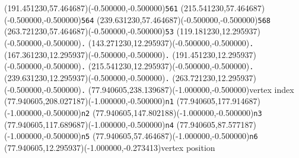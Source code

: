 \documentclass[12pt]{article}
\begin{document}
\fontsize{12.000000}{14.400000}\selectfont
\ASYalign(191.451230,57.464687)(-0.500000,-0.500000){\texttt{561}}%
\color{ASYcolor}
\fontsize{12.000000}{14.400000}\selectfont
\ASYalign(215.541230,57.464687)(-0.500000,-0.500000){\texttt{564}}%
\color{ASYcolor}
\fontsize{12.000000}{14.400000}\selectfont
\ASYalign(239.631230,57.464687)(-0.500000,-0.500000){\texttt{568}}%
\color{ASYcolor}
\fontsize{12.000000}{14.400000}\selectfont
\ASYalign(263.721230,57.464687)(-0.500000,-0.500000){\texttt{53}}%
\color{ASYcolor}
\fontsize{12.000000}{14.400000}\selectfont
\ASYalign(119.181230,12.295937)(-0.500000,-0.500000){\texttt{.}}%
\color{ASYcolor}
\fontsize{12.000000}{14.400000}\selectfont
\ASYalign(143.271230,12.295937)(-0.500000,-0.500000){\texttt{.}}%
\color{ASYcolor}
\fontsize{12.000000}{14.400000}\selectfont
\ASYalign(167.361230,12.295937)(-0.500000,-0.500000){\texttt{.}}%
\color{ASYcolor}
\fontsize{12.000000}{14.400000}\selectfont
\ASYalign(191.451230,12.295937)(-0.500000,-0.500000){\texttt{.}}%
\color{ASYcolor}
\fontsize{12.000000}{14.400000}\selectfont
\ASYalign(215.541230,12.295937)(-0.500000,-0.500000){\texttt{.}}%
\color{ASYcolor}
\fontsize{12.000000}{14.400000}\selectfont
\ASYalign(239.631230,12.295937)(-0.500000,-0.500000){\texttt{.}}%
\color{ASYcolor}
\fontsize{12.000000}{14.400000}\selectfont
\ASYalign(263.721230,12.295937)(-0.500000,-0.500000){\texttt{.}}%
\color{ASYcolor}
\fontsize{12.000000}{14.400000}\selectfont
\ASYalign(77.940605,238.139687)(-1.000000,-0.500000){vertex index}%
\color{ASYcolor}
\fontsize{12.000000}{14.400000}\selectfont
\ASYalign(77.940605,208.027187)(-1.000000,-0.500000){\texttt{n1}}%
\color{ASYcolor}
\fontsize{12.000000}{14.400000}\selectfont
\ASYalign(77.940605,177.914687)(-1.000000,-0.500000){\texttt{n2}}%
\color{ASYcolor}
\fontsize{12.000000}{14.400000}\selectfont
\ASYalign(77.940605,147.802188)(-1.000000,-0.500000){\texttt{n3}}%
\color{ASYcolor}
\fontsize{12.000000}{14.400000}\selectfont
\ASYalign(77.940605,117.689687)(-1.000000,-0.500000){\texttt{n4}}%
\color{ASYcolor}
\fontsize{12.000000}{14.400000}\selectfont
\ASYalign(77.940605,87.577187)(-1.000000,-0.500000){\texttt{n5}}%
\color{ASYcolor}
\fontsize{12.000000}{14.400000}\selectfont
\ASYalign(77.940605,57.464687)(-1.000000,-0.500000){\texttt{n6}}%
\color{ASYcolor}
\fontsize{12.000000}{14.400000}\selectfont
\ASYalign(77.940605,12.295937)(-1.000000,-0.273413){vertex position}%
\end{document}
